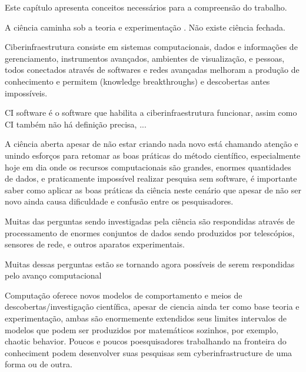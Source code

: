 
{Este capítulo apresenta conceitos necessários para a compreensão do trabalho.}
\label{fundamentacao}

A ciência caminha sob a teoria e experimentação \cite{vardi2010science}. Não
existe ciência fechada.

Ciberinfraestrutura consiste em sistemas computacionais, dados e informações
de gerenciamento, instrumentos avançados, ambientes de visualização, e pessoas,
todos conectados através de softwares e redes avançadas melhoram a produção
de conhecimento e permitem (knowledge breakthroughs) e descobertas antes
impossíveis.

CI software é o software que habilita a ciberinfraestrutura funcionar, assim como CI
também não há definição precisa,  ...

A ciência aberta apesar de não estar criando nada novo está chamando atenção
e unindo esforços para retomar as boas práticas do método científico, especialmente
hoje em dia onde os recursos computacionais são grandes, enormes quantidades
de dados, e praticamente impossível realizar pesquisa sem software, é importante
saber como aplicar as boas práticas da ciência neste cenário que apesar de não
ser novo ainda causa dificuldade e confusão entre os pesquisadores.

Muitas das perguntas sendo investigadas pela ciência são respondidas através
de processamento de enormes conjuntos de dados sendo produzidos por telescópios,
sensores de rede, e outros aparatos experimentais.

Muitas dessas perguntas estão se tornando agora possíveis de serem respondidas
pelo avanço computacional

Computação oferece novos modelos de comportamento e meios de
descobertas/investigação científica, apesar de ciencia ainda ter como base
teoria e experimentação, ambas são enormemente extendidos seus limites
intervalos de modelos que podem ser produzidos por matemáticos sozinhos, por
exemplo, chaotic behavior. Poucos e poucos poesquisadores trabalhando na
fronteira do conheciment podem desenvolver suas pesquisas sem
cyberinfrastructure de uma forma ou de outra.

